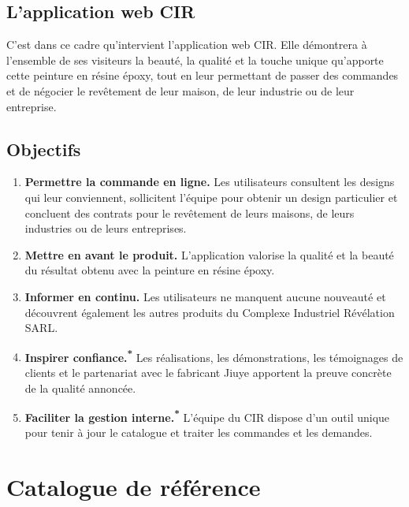 \documentclass[11pt,a4paper]{article}
\newcommand{\prop}{\textsuperscript{\color{circoral}\textbf{*}}}
\begin{document}
\subsection{L'application web CIR}

C'est dans ce cadre qu'intervient l'application web CIR. Elle démontrera à
l'ensemble de ses visiteurs la beauté, la qualité et la touche unique
qu'apporte cette peinture en résine époxy, tout en leur permettant de passer
des commandes et de négocier le revêtement de leur maison, de leur industrie
ou de leur entreprise.

\subsection{Objectifs}
\enlargethispage{\baselineskip}%

\begin{enumerate}[label={\color{circoral}\bfseries O\arabic*.},leftmargin=2.4em,itemsep=0.4em]
  \item \textbf{Permettre la commande en ligne.} Les utilisateurs consultent
        les designs qui leur conviennent, sollicitent l'équipe pour obtenir un
        design particulier et concluent des contrats pour le revêtement de
        leurs maisons, de leurs industries ou de leurs entreprises.
  \item \textbf{Mettre en avant le produit.} L'application valorise la qualité
        et la beauté du résultat obtenu avec la peinture en résine époxy.
  \item \textbf{Informer en continu.} Les utilisateurs ne manquent aucune
        nouveauté et découvrent également les autres produits du Complexe
        Industriel Révélation SARL.
  \item \textbf{Inspirer confiance.}\prop{} Les réalisations, les
        démonstrations, les témoignages de clients et le partenariat avec le
        fabricant Jiuye apportent la preuve concrète de la qualité annoncée.
  \item \textbf{Faciliter la gestion interne.}\prop{} L'équipe du CIR dispose
        d'un outil unique pour tenir à jour le catalogue et traiter les
        commandes et les demandes.
\end{enumerate}

\section{Catalogue de référence}
\label{sec:catalogue}
\end{document}
